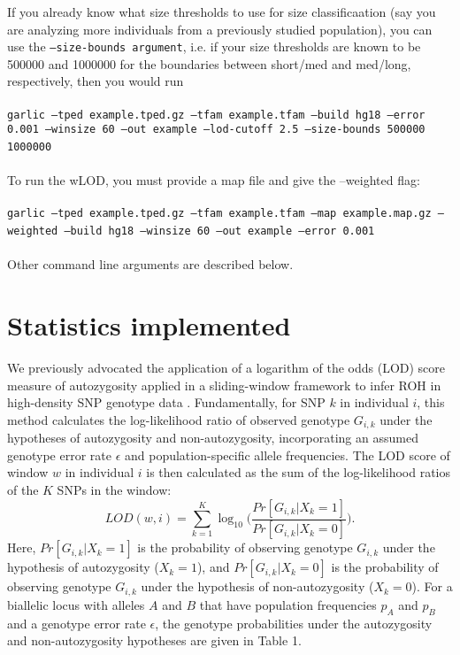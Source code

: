 \documentclass[12pt]{article}%
\begin{document}
\noindent If you already know what size thresholds to use for size classificaation (say you are analyzing more individuals from a previously studied population), you can use the {\tt --size-bounds argument}, i.e. if your size thresholds are known to be 500000 and 1000000 for the boundaries between short/med and med/long, respectively, then you would run
~\\\\
{\tt garlic --tped example.tped.gz --tfam example.tfam --build hg18 --error 0.001 --winsize 60 --out example --lod-cutoff 2.5 --size-bounds 500000 1000000}
~\\\\
\noindent To run the wLOD, you must provide a map file and give the --weighted flag:
~\\\\
{\tt garlic --tped example.tped.gz --tfam example.tfam --map example.map.gz --weighted --build hg18 --winsize 60 --out example --error 0.001}
~\\\\
\noindent Other command line arguments are described below.

\section{Statistics implemented}

We previously advocated the application of a logarithm of the odds (LOD) score measure of autozygosity applied in a sliding-window framework to infer ROH in high-density SNP genotype data \cite[]{PembertonEtAl12:AJHG}. Fundamentally, for SNP $k$ in individual $i$, this method calculates the log-likelihood ratio of observed genotype $G_{i,k}$ under the hypotheses of autozygosity and non-autozygosity, incorporating an assumed genotype error rate $\epsilon$ and population-specific allele frequencies. The LOD score of window $w$ in individual $i$ is then calculated as the sum of the log-likelihood ratios of the $K$ SNPs in the window: 
\begin{equation}
LOD(w,i)= \sum_{k=1}^K \log_{10}\Big(\frac{Pr[G_{i,k} | X_k = 1]}{Pr⁡[G_{i,k} |X_k=0]}\Big).
\end{equation}
Here, $Pr⁡[G_{i,k} |X_k=1]$ is the probability of observing genotype $G_{i,k}$ under the hypothesis of autozygosity ($X_k=1$), and $Pr⁡[G_{i,k} |X_k=0]$ is the probability of observing genotype $G_{i,k}$ under the hypothesis of non-autozygosity ($X_k=0$). For a biallelic locus with alleles $A$ and $B$ that have population frequencies $p_A$ and $p_B$ and a genotype error rate $\epsilon$, the genotype probabilities under the autozygosity and non-autozygosity hypotheses are given in Table 1.
\end{document}
